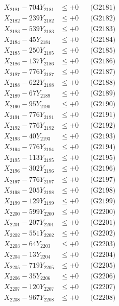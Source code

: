 \documentclass[a4paper,10pt]{article}
\begin{document}
{\begin{align}
\allowbreak
X_{2181} - 704Y_{2181} &\leq +0 && \text{(G2181)} \\
X_{2182} - 239Y_{2182} &\leq +0 && \text{(G2182)} \\
X_{2183} - 539Y_{2183} &\leq +0 && \text{(G2183)} \\
X_{2184} - 45Y_{2184} &\leq +0 && \text{(G2184)} \\
X_{2185} - 250Y_{2185} &\leq +0 && \text{(G2185)} \\
X_{2186} - 137Y_{2186} &\leq +0 && \text{(G2186)} \\
X_{2187} - 776Y_{2187} &\leq +0 && \text{(G2187)} \\
X_{2188} - 622Y_{2188} &\leq +0 && \text{(G2188)} \\
X_{2189} - 67Y_{2189} &\leq +0 && \text{(G2189)} \\
X_{2190} - 95Y_{2190} &\leq +0 && \text{(G2190)} \\
\allowbreak
X_{2191} - 776Y_{2191} &\leq +0 && \text{(G2191)} \\
X_{2192} - 776Y_{2192} &\leq +0 && \text{(G2192)} \\
X_{2193} - 40Y_{2193} &\leq +0 && \text{(G2193)} \\
X_{2194} - 776Y_{2194} &\leq +0 && \text{(G2194)} \\
X_{2195} - 113Y_{2195} &\leq +0 && \text{(G2195)} \\
X_{2196} - 302Y_{2196} &\leq +0 && \text{(G2196)} \\
X_{2197} - 776Y_{2197} &\leq +0 && \text{(G2197)} \\
X_{2198} - 205Y_{2198} &\leq +0 && \text{(G2198)} \\
X_{2199} - 129Y_{2199} &\leq +0 && \text{(G2199)} \\
X_{2200} - 599Y_{2200} &\leq +0 && \text{(G2200)} \\
\allowbreak
X_{2201} - 207Y_{2201} &\leq +0 && \text{(G2201)} \\
X_{2202} - 551Y_{2202} &\leq +0 && \text{(G2202)} \\
X_{2203} - 64Y_{2203} &\leq +0 && \text{(G2203)} \\
X_{2204} - 13Y_{2204} &\leq +0 && \text{(G2204)} \\
X_{2205} - 719Y_{2205} &\leq +0 && \text{(G2205)} \\
X_{2206} - 35Y_{2206} &\leq +0 && \text{(G2206)} \\
X_{2207} - 120Y_{2207} &\leq +0 && \text{(G2207)} \\
X_{2208} - 967Y_{2208} &\leq +0 && \text{(G2208)} \\

\end{align}}
\end{document}
